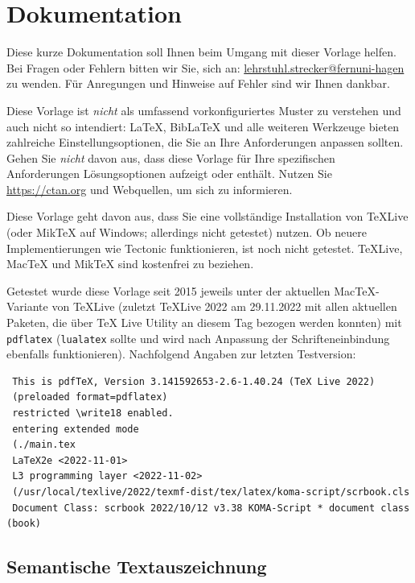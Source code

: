 

\lstset{language=C}

\chapter{Dokumentation}

Diese kurze Dokumentation soll Ihnen beim Umgang mit dieser Vorlage helfen. Bei Fragen oder Fehlern bitten wir Sie, sich an: \href{mailto:lehrstuhl.strecker@fernuni-hagen}{lehrstuhl.strecker@fernuni-hagen} zu wenden. Für Anregungen und Hinweise auf Fehler sind wir Ihnen dankbar.

Diese Vorlage ist \emph{nicht} als umfassend vorkonfiguriertes Muster zu verstehen und auch nicht so intendiert: LaTeX, BibLaTeX und alle weiteren Werkzeuge bieten zahlreiche Einstellungsoptionen, die Sie an Ihre Anforderungen anpassen sollten. Gehen Sie \emph{nicht} davon aus, dass diese Vorlage für Ihre spezifischen Anforderungen Lösungsoptionen aufzeigt oder enthält. Nutzen Sie \url{https://ctan.org} und Webquellen, um sich zu informieren.

Diese Vorlage geht davon aus, dass Sie eine vollständige Installation von TeXLive (oder MikTeX auf Windows; allerdings nicht getestet) nutzen. Ob neuere Implementierungen wie Tectonic funktionieren, ist noch nicht getestet. TeXLive, MacTeX und MikTeX sind kostenfrei zu beziehen.

Getestet wurde diese Vorlage seit 2015 jeweils unter der aktuellen MacTeX-Variante von TeXLive (zuletzt TeXLive 2022 am 29.11.2022 mit allen aktuellen Paketen, die über TeX Live Utility an diesem Tag bezogen werden konnten) mit \verb|pdflatex| (\verb|lualatex| sollte und wird nach Anpassung der Schrifteneinbindung ebenfalls funktionieren). Nachfolgend Angaben zur letzten Testversion:

\begin{verbatim}
 This is pdfTeX, Version 3.141592653-2.6-1.40.24 (TeX Live 2022) 
 (preloaded format=pdflatex)
 restricted \write18 enabled.
 entering extended mode
 (./main.tex
 LaTeX2e <2022-11-01>
 L3 programming layer <2022-11-02>
 (/usr/local/texlive/2022/texmf-dist/tex/latex/koma-script/scrbook.cls
 Document Class: scrbook 2022/10/12 v3.38 KOMA-Script * document class (book)

\end{verbatim}




\section{Semantische Textauszeichnung}
\label{sec:semant-textauszeichnung}

